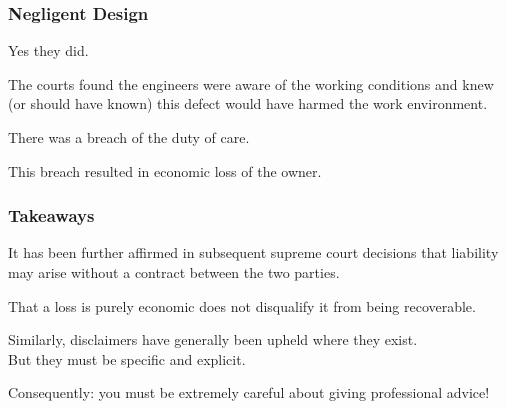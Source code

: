\begin{frame}
\frametitle{Negligent Design}

Yes they did.

The courts found the engineers were aware of the working conditions and knew (or should have known) this defect would have harmed the work environment.

There was a breach of the duty of care.

This breach resulted in economic loss of the owner.


\end{frame}


\begin{frame}
\frametitle{Takeaways}

It has been further affirmed in subsequent supreme court decisions that liability may arise without a contract between the two parties.

That a loss is purely economic does not disqualify it from being recoverable.

Similarly, disclaimers have generally been upheld where they exist.\\
\quad But they must be specific and explicit.


Consequently: you must be extremely careful about giving professional advice! 


\end{frame}




